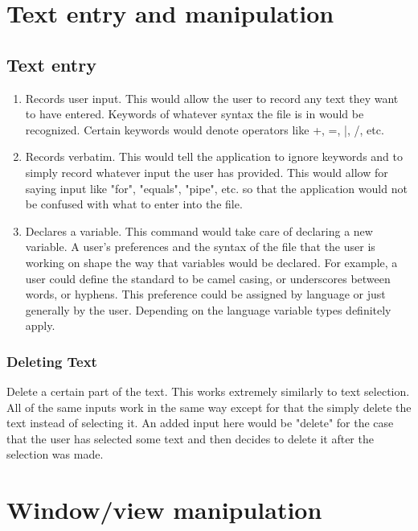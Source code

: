 \documentclass[11pt, oneside]{article}
\begin{document}
\section{Text entry and manipulation}

	\subsection{Text entry}
	\begin{enumerate}
	\item {}
	Records user input. This would allow the user to record any text they want to have entered. Keywords of whatever syntax the file is in would be recognized. Certain keywords would denote operators like +, =, |, /, etc. 

	\item {}
	Records verbatim. This would tell the application to ignore keywords and to simply record whatever input the user has provided. This would allow for saying input like "for", "equals", "pipe", etc. so that the application would not be confused with what to enter into the file.

	\item {}
	Declares a variable. This command would take care of declaring a new variable. A user's preferences and the syntax of the file that the user is working on shape the way that variables would be declared. For example, a user could define the standard to be camel casing, or underscores between words, or hyphens. This preference could be assigned by language or just generally by the user. Depending on the language variable types definitely apply.
	\end{enumerate}

	\subsubsection{Deleting Text}
	Delete a certain part of the text. This works extremely similarly to text selection. All of the same inputs work in the same way except for that the simply delete the text instead of selecting it. An added input here would be "delete" for the case that the user has selected some text and then decides to delete it after the selection was made.


\section{Window/view manipulation}
\end{document}
